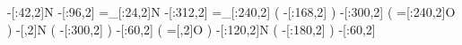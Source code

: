       -[:42,2]N%
      -[:96,2]%
     =_[:24,2]N%
     -[:312,2]%
    =_[:240,2]%
                 (
         -[:168,2]\phantom{N}%
                 )
     -[:300,2]%
                 (
         =[:240,2]O%
                 )
         -[,2]N%
                 (
         -[:300,2]%
                 )
      -[:60,2]%
                 (
             =[,2]O%
                 )
     -[:120,2]N%
                 (
         -[:180,2]%
                 )
      -[:60,2]%
